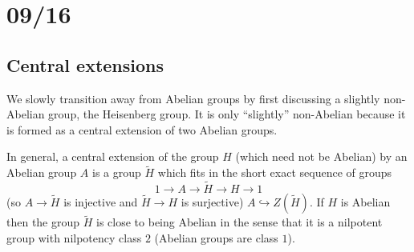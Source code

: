 \documentclass[../../rtnotes.tex]{subfiles}
\begin{document}
\section{09/16}
\subsection{Central extensions}
We slowly transition away from Abelian groups by first discussing a slightly non-Abelian group, the Heisenberg group. It is only ``slightly'' non-Abelian because it is formed as a central extension of two Abelian groups. 

In general, a central extension of the group $H$ (which need not be Abelian) by an Abelian group $A$ is a group $\tilde H$ which fits in the short exact sequence of groups 
\[1\to A\to \widetilde H\to H \to 1\]
(so $A\to \widetilde H$ is injective and $\widetilde H \to H$ is surjective)  $A\hookrightarrow Z(\widetilde H)$. If $H$ is Abelian then the group $\widetilde H$ is close to being Abelian in the sense that it is a nilpotent group with nilpotency class $2$ (Abelian groups are class $1$).
\end{document}
